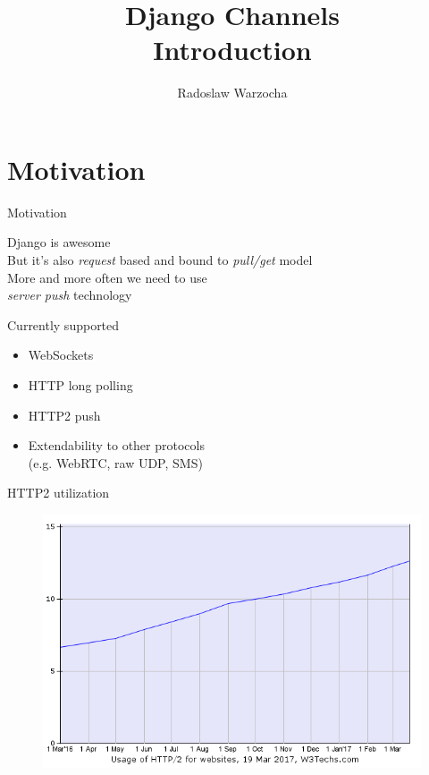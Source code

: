 \documentclass{beamer}
\title{Django Channels\\Introduction}
\author[Radoslaw Warzocha]{Radoslaw Warzocha}
\begin{document}
\begin{frame}
	\titlepage
\end{frame}

\section{Motivation}

\begin{frame}{Motivation}
	\begin{center}
		Django is awesome\\
		\vspace{1em}
		But it's also \textit{request} based and bound to \textit{pull/get} model\\
		\vspace{1em}
		More and more often we need to use\\
		\textit{server push} technology
	\end{center}
\end{frame}

\begin{frame}{Currently supported}
	\begin{adjustwidth}{2em}{2.5em}
	\begin{itemize}
		\item WebSockets
		\item HTTP long polling
		\item HTTP2 push
		\item Extendability to other protocols\\ (e.g. WebRTC, raw UDP, SMS)
	\end{itemize}
	\end{adjustwidth}
\end{frame}

\begin{frame}{HTTP2 utilization}
	\begin{center}
		\begin{figure}
			\includegraphics[scale=0.45]{ce-http2.png}
		\end{figure}
	\end{center}
\end{frame}
\end{document}
